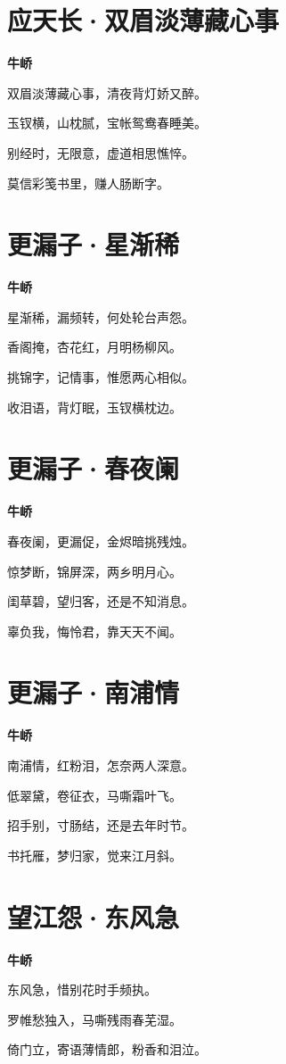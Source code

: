 \documentclass[12pt,a4paper]{ctexbook}
\begin{document}
\section{应天长·双眉淡薄藏心事}
\textbf{牛峤}\par\vspace{0.5em}
双眉淡薄藏心事，清夜背灯娇又醉。\par
玉钗横，山枕腻，宝帐鸳鸯春睡美。\par
别经时，无限意，虚道相思憔悴。\par
莫信彩笺书里，赚人肠断字。\par

\section{更漏子·星渐稀}
\textbf{牛峤}\par\vspace{0.5em}
星渐稀，漏频转，何处轮台声怨。\par
香阁掩，杏花红，月明杨柳风。\par
挑锦字，记情事，惟愿两心相似。\par
收泪语，背灯眠，玉钗横枕边。\par

\section{更漏子·春夜阑}
\textbf{牛峤}\par\vspace{0.5em}
春夜阑，更漏促，金烬暗挑残烛。\par
惊梦断，锦屏深，两乡明月心。\par
闺草碧，望归客，还是不知消息。\par
辜负我，悔怜君，靠天天不闻。\par

\section{更漏子·南浦情}
\textbf{牛峤}\par\vspace{0.5em}
南浦情，红粉泪，怎奈两人深意。\par
低翠黛，卷征衣，马嘶霜叶飞。\par
招手别，寸肠结，还是去年时节。\par
书托雁，梦归家，觉来江月斜。\par

\section{望江怨·东风急}
\textbf{牛峤}\par\vspace{0.5em}
东风急，惜别花时手频执。\par
罗帷愁独入，马嘶残雨春芜湿。\par
倚门立，寄语薄情郎，粉香和泪泣。\par
\end{document}
